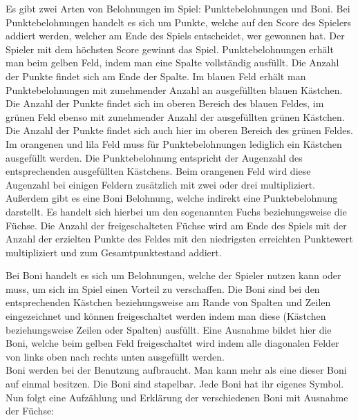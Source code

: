 Es gibt zwei Arten von Belohnungen im Spiel: Punktebelohnungen und Boni. Bei Punktebelohnungen handelt es sich um Punkte, welche auf den Score des Spielers addiert werden, welcher am Ende des Spiels entscheidet, wer gewonnen hat. Der Spieler mit dem höchsten Score gewinnt das Spiel. Punktebelohnungen erhält man beim gelben Feld, indem man eine Spalte vollständig ausfüllt. Die Anzahl der Punkte findet sich am Ende der Spalte. Im blauen Feld erhält man Punktebelohnungen mit zunehmender Anzahl an ausgefüllten blauen Kästchen. Die Anzahl der Punkte findet sich im oberen Bereich des blauen Feldes, im grünen Feld ebenso mit zunehmender Anzahl der ausgefüllten grünen Kästchen. Die Anzahl der Punkte findet sich auch hier im oberen Bereich des grünen Feldes. Im orangenen und lila Feld muss für Punktebelohnungen lediglich ein Kästchen ausgefüllt werden. Die Punktebelohnung entspricht der Augenzahl des entsprechenden ausgefüllten Kästchens. Beim orangenen Feld wird diese Augenzahl bei einigen Feldern zusätzlich mit zwei oder drei multipliziert. Außerdem gibt es eine Boni Belohnung, welche indirekt eine Punktebelohnung darstellt. Es handelt sich hierbei um den sogenannten Fuchs beziehungsweise die Füchse. Die Anzahl der freigeschalteten Füchse wird am Ende des Spiels mit der Anzahl der erzielten Punkte des Feldes mit den niedrigsten erreichten Punktewert multipliziert und zum Gesamtpunktestand addiert.

Bei Boni handelt es sich um Belohnungen, welche der Spieler nutzen kann oder muss, um sich im Spiel einen Vorteil zu verschaffen. Die Boni sind bei den entsprechenden Kästchen beziehungsweise am Rande von Spalten und Zeilen eingezeichnet und können freigeschaltet werden indem man diese (Kästchen beziehungsweise Zeilen oder Spalten) ausfüllt. Eine Ausnahme bildet hier die Boni, welche beim gelben Feld freigeschaltet wird indem alle diagonalen Felder von links oben nach rechts unten ausgefüllt werden. \\

Boni werden bei der Benutzung aufbraucht. Man kann mehr als eine dieser Boni auf einmal besitzen. Die Boni sind stapelbar. Jede Boni hat ihr eigenes Symbol. Nun folgt eine Aufzählung und Erklärung der verschiedenen Boni mit Ausnahme der Füchse:

